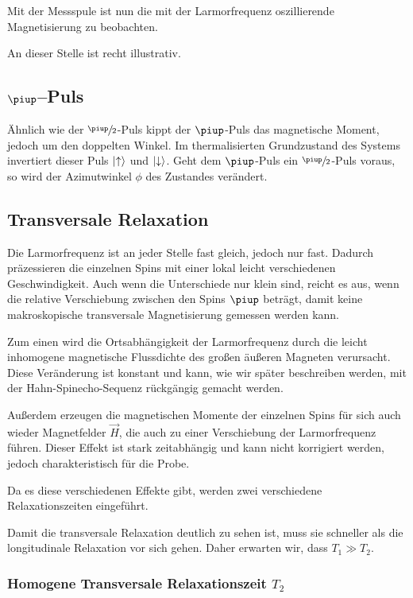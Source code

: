 Mit der Messspule ist nun die mit der Larmorfrequenz oszillierende
Magnetisierung zu beobachten.

An dieser Stelle ist \cite[Abbildung~15.55 auf Seite~765]{meschede-gerthsen_24}
recht illustrativ.

\subsection{$\piup$–Puls}

Ähnlich wie der $\sfrac\piup2$-Puls kippt der $\piup$-Puls das magnetische
Moment, jedoch um den doppelten Winkel. Im thermalisierten Grundzustand des
Systems invertiert dieser Puls $\ket\uparrow$ und $\ket\downarrow$. Geht dem
$\piup$-Puls ein $\sfrac\piup2$-Puls voraus, so wird der Azimutwinkel $\phi$
des Zustandes verändert.

\subsection{Transversale Relaxation}

Die Larmorfrequenz ist an jeder Stelle fast gleich, jedoch nur fast. Dadurch
präzessieren die einzelnen Spins mit einer lokal leicht verschiedenen
Geschwindigkeit. Auch wenn die Unterschiede nur klein sind, reicht es aus, wenn
die relative Verschiebung zwischen den Spins $\piup$ beträgt, damit keine
makroskopische transversale Magnetisierung gemessen werden kann.

Zum einen wird die Ortsabhängigkeit der Larmorfrequenz durch die leicht
inhomogene magnetische Flussdichte des großen äußeren Magneten verursacht.
Diese Veränderung ist konstant und kann, wie wir später beschreiben werden, mit
der Hahn-Spinecho-Sequenz rückgängig gemacht werden.

Außerdem erzeugen die magnetischen Momente der einzelnen Spins für sich auch
wieder Magnetfelder $\vec H$, die auch zu einer Verschiebung der Larmorfrequenz
führen. Dieser Effekt ist stark zeitabhängig und kann nicht korrigiert werden,
jedoch charakteristisch für die Probe.

Da es diese verschiedenen Effekte gibt, werden zwei verschiedene
Relaxationszeiten eingeführt.

Damit die transversale Relaxation deutlich zu sehen ist, muss sie schneller als
die longitudinale Relaxation vor sich gehen. Daher erwarten wir, dass $T_1 \gg
T_2$.

\subsubsection{Homogene Transversale Relaxationszeit $T_2$}


